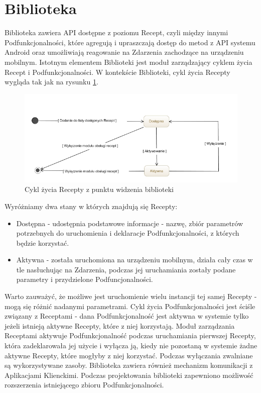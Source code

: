 \documentclass[11pt,a4paper,polish,thesis]{dcsbook}
\begin{document}
\section{Biblioteka}
Biblioteka zawiera API dostępne z poziomu Recept, czyli między innymi Podfunkcjonalności, które agregują i upraszczają dostęp do metod z API systemu Android oraz umożliwiają reagowanie na Zdarzenia zachodzące na urządzeniu mobilnym.
Istotnym elementem Biblioteki jest moduł zarządzający cyklem życia Recept i Podfunkcjonalności. W kontekście Biblioteki, cykl życia Recepty wygląda tak jak na rysunku
\ref{fig:cykl-zycia-recepty}.
\begin{figure}[H]
  \centering
  \includegraphics[scale=0.6]{./resources/cykl-zycia-recepty.jpg}
  \caption{Cykl życia Recepty z punktu widzenia biblioteki}
  \label{fig:cykl-zycia-recepty}
\end{figure}
Wyróżniamy dwa stany w których znajdują się Recepty:
\begin{itemize}
\item Dostępna - udostępnia podstawowe informacje - nazwę, zbiór parametrów potrzebnych do uruchomienia i deklaracje Podfunkcjonalności, z których będzie korzystać.
\item Aktywna - została uruchomiona na urządzeniu mobilnym, działa cały czas w tle nasłuchując na Zdarzenia, podczas jej uruchamiania zostały podane parametry i przydzielone Podfuncjonalności.
\end{itemize}
Warto zauważyć, że możliwe jest uruchomienie wielu instancji tej samej Recepty - mogą się różnić nadanymi parametrami.
Cykl życia Podfunkcjonalności jest ściśle związany z Receptami - dana Podfunkcjonalność jest aktywna w systemie tylko jeżeli istnieją aktywne Recepty, które z niej korzystają. 
Moduł zarządzania Receptami aktywuje Podfunkcjonalność podczas uruchamiania pierwszej Recepty, która zadeklarowała jej użycie i wyłącza ją, kiedy nie pozostaną w systemie żadne aktywne Recepty, które mogłyby z niej korzystać.
Podczas wyłączania zwalniane są wykorzystywane zasoby. Biblioteka zawiera również mechanizm komunikacji z Aplikacjami Klienckimi. Podczas projektowania biblioteki zapewniono możliwość rozszerzenia istniejącego zbioru Podfunkcjonalności.
\end{document}
